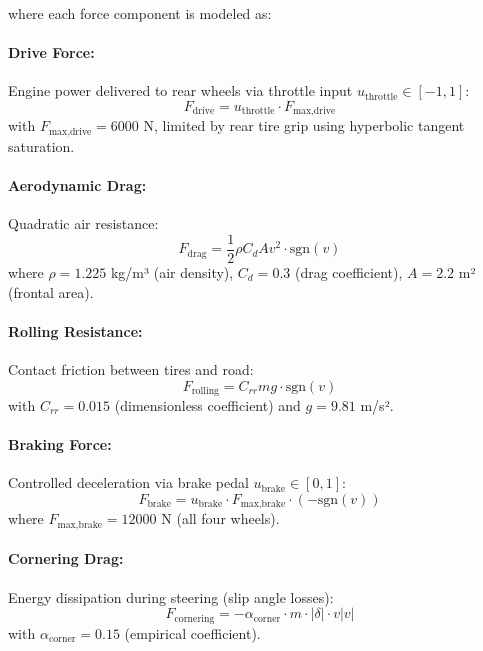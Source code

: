 \documentclass[12pt]{article}
\begin{document}
where each force component is modeled as:

\paragraph{Drive Force:} Engine power delivered to rear wheels via throttle input $u_{\text{throttle}} \in [-1, 1]$:
\begin{equation}
F_{\text{drive}} = u_{\text{throttle}} \cdot F_{\text{max,drive}}
\end{equation}
with $F_{\text{max,drive}} = 6000$ N, limited by rear tire grip using hyperbolic tangent saturation.

\paragraph{Aerodynamic Drag:} Quadratic air resistance:
\begin{equation}
F_{\text{drag}} = \frac{1}{2} \rho C_d A v^2 \cdot \text{sgn}(v)
\end{equation}
where $\rho = 1.225$ kg/m³ (air density), $C_d = 0.3$ (drag coefficient), $A = 2.2$ m² (frontal area).

\paragraph{Rolling Resistance:} Contact friction between tires and road:
\begin{equation}
F_{\text{rolling}} = C_{rr} m g \cdot \text{sgn}(v)
\end{equation}
with $C_{rr} = 0.015$ (dimensionless coefficient) and $g = 9.81$ m/s².

\paragraph{Braking Force:} Controlled deceleration via brake pedal $u_{\text{brake}} \in [0, 1]$:
\begin{equation}
F_{\text{brake}} = u_{\text{brake}} \cdot F_{\text{max,brake}} \cdot (-\text{sgn}(v))
\end{equation}
where $F_{\text{max,brake}} = 12000$ N (all four wheels).

\paragraph{Cornering Drag:} Energy dissipation during steering (slip angle losses):
\begin{equation}
F_{\text{cornering}} = -\alpha_{\text{corner}} \cdot m \cdot |\delta| \cdot v |v|
\end{equation}
with $\alpha_{\text{corner}} = 0.15$ (empirical coefficient).
\end{document}
